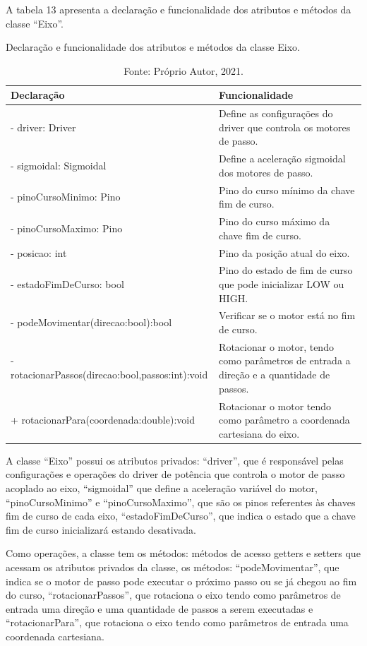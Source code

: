 A tabela 13 apresenta a declaração e funcionalidade dos atributos e métodos da classe “Eixo”.

\begin{table}
    \centering
    \caption{Declaração e funcionalidade dos atributos e métodos da classe Eixo.}
    \begin{tabular}{lp{6cm}}
        \hline
        \textbf{Declaração} & \textbf{Funcionalidade}\\
        \hline
        - driver: Driver & Define as configurações do driver que controla os motores de passo.\\
        - sigmoidal: Sigmoidal & Define a aceleração sigmoidal dos motores de passo.\\
        - pinoCursoMinimo: Pino & Pino do curso mínimo da chave fim de curso.\\
        - pinoCursoMaximo: Pino & Pino do curso máximo da chave fim de curso.\\
        - posicao: int & Pino da posição atual do eixo.\\
        - estadoFimDeCurso: bool & Pino do estado de fim de curso que pode inicializar LOW ou HIGH.\\
        - podeMovimentar(direcao:bool):bool & Verificar se o motor está no fim de curso.\\
        - rotacionarPassos(direcao:bool,passos:int):void & Rotacionar o motor, tendo como parâmetros de entrada a direção e a quantidade de passos.\\
        + rotacionarPara(coordenada:double):void & Rotacionar o motor tendo como parâmetro a coordenada cartesiana do eixo.\\
        \hline       
    \end{tabular}
    \caption*{Fonte: Próprio Autor, 2021.}
    \label{tab:classeeixo}
\end{table}

A classe “Eixo” possui os atributos privados: “driver”, que é responsável pelas configurações e operações 
do driver de potência que controla o motor de passo acoplado ao eixo, “sigmoidal” que define a aceleração 
variável do motor, “pinoCursoMinimo” e “pinoCursoMaximo”, que são os pinos referentes às chaves fim de 
curso de cada eixo, “estadoFimDeCurso”, que indica o estado que a chave fim de curso inicializará estando 
desativada. 

Como operações, a classe tem os métodos: métodos de acesso getters e setters que acessam os atributos 
privados da classe, os métodos: “podeMovimentar”, que indica se o motor de passo pode executar o próximo 
passo ou se já chegou ao fim do curso, “rotacionarPassos”, que rotaciona o eixo tendo como parâmetros de 
entrada uma direção e uma quantidade de passos a serem executadas e “rotacionarPara”, que rotaciona o 
eixo tendo como parâmetros de entrada uma coordenada cartesiana.


